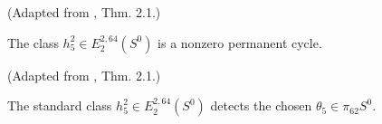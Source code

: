 \begin{theorem}
\label{frontier:Literature:bc100fe38326}
(Adapted from \cite{BJMtheta5}, Thm. 2.1.)\par{}

The class $h_5^2\in E_2^{2,64}(S^0)$ is a nonzero permanent cycle.
\end{theorem}

\begin{theorem}
\label{frontier:Literature:71f4461cf400}
(Adapted from \cite{BJMtheta5}, Thm. 2.1.)\par{}

The standard class $h_5^2\in E_2^{2,64}(S^0)$ detects the chosen $\theta_5\in\pi_{62}S^0$.
\end{theorem}

